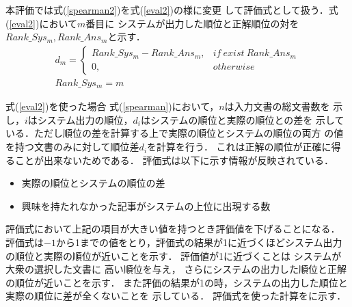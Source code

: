 \documentclass[japanese]{jnlp_1.4}
\newcounter{ex}
\def\exref#1{}
\begin{document}
本評価では式(\ref{spearman2})を式(\ref{eval2})の様に変更
して評価式として扱う．式(\ref{eval2})において$m$番目に
システムが出力した順位と正解順位の対を$Rank\_Sys_{m},Rank\_Ans_{m}$と示す．
\begin{gather}
 d_m = 
 \begin{cases}
  Rank\_Sys_{m} - Rank\_Ans_{m}, & if~exist\ Rank\_Ans_{m} \\
  0 , & otherwise
 \end{cases}
	\label{eval2}\\
 Rank\_Sys_{m} = m
	\label{eval3}
\end{gather}

式(\ref{eval2})を使った場合
式(\ref{spearman})において，$n$は入力文書の総文書数を
示し，$i$はシステム出力の順位，$d_i$はシステムの順位と実際の順位との差を
示している．ただし順位の差を計算する上で実際の順位とシステムの順位の両方
の値を持つ文書のみに対して順位差$d_i$を計算を行う．
これは正解の順位が正確に得ることが出来ないためである．
評価式は以下に示す情報が反映されている．
\begin{itemize}
\item 実際の順位とシステムの順位の差
\item 興味を持たれなかった記事がシステムの上位に出現する数
\end{itemize}

評価式において上記の項目が大きい値を持つとき評価値を下げることになる．
評価式は$-1$から1までの値をとり，評価式の結果が1に近づくほどシステム出力の順位と実際の順位が近いことを示す．
評価値が1に近づくことは
システムが大衆の選択した文書に
高い順位を与え，
さらにシステムの出力した順位と正解の順位が近いことを示す．
また評価の結果が1の時，システムの出力した順位と実際の順位に差が全くないことを
示している．
評価式を使った計算を\exref{evalex}に示す．
\end{document}
